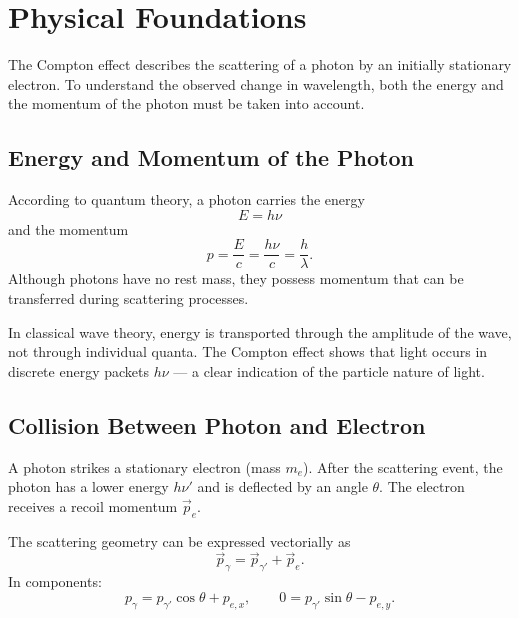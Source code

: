 
\section{Physical Foundations}

The Compton effect describes the scattering of a photon by an initially stationary electron. 
To understand the observed change in wavelength, both the energy 
and the momentum of the photon must be taken into account.

\subsection{Energy and Momentum of the Photon}
According to quantum theory, a photon carries the energy
\[
E = h\nu
\]
and the momentum
\[
p = \frac{E}{c} = \frac{h\nu}{c} = \frac{h}{\lambda}.
\]
Although photons have no rest mass, they possess momentum 
that can be transferred during scattering processes. 

\begin{DidacticBox}
	In classical wave theory, energy is transported through the amplitude of the wave, 
	not through individual quanta. 
	The Compton effect shows that light occurs in discrete energy packets \( h\nu \) — 
	a clear indication of the particle nature of light.
\end{DidacticBox}

\subsection{Collision Between Photon and Electron}
A photon strikes a stationary electron (mass \( m_e \)). 
After the scattering event, the photon has a lower energy \( h\nu' \) 
and is deflected by an angle \( \theta \). 
The electron receives a recoil momentum \( \vec{p}_e \).

\begin{PhysicsBox}
	\small
	The scattering geometry can be expressed vectorially as
	\[
	\vec{p}_\gamma = \vec{p}_{\gamma'} + \vec{p}_e.
	\]
	In components:
	\[
	p_\gamma = p_{\gamma'}\cos\theta + p_{e,x}, \qquad
	0 = p_{\gamma'}\sin\theta - p_{e,y}.
	\]
\end{PhysicsBox}

